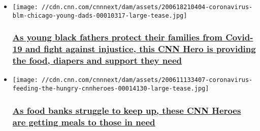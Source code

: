 \begin{itemize}
\item
  \href{/2020/06/18/us/coronavirus-blm-young-fathers-chicago-cnnheroes/index.html}{}

  \texttt{[image: //cdn.cnn.com/cnnnext/dam/assets/200618210404-coronavirus-blm-chicago-young-dads-00010317-large-tease.jpg]}

  \hypertarget{as-young-black-fathers-protect-their-families-from-covid-19-and-fight-against-injustice-this-cnn-hero-is-providing-the-food-diapers-and-support-they-need}{%
  \subsubsection{\texorpdfstring{\href{/2020/06/18/us/coronavirus-blm-young-fathers-chicago-cnnheroes/index.html}{As
  young black fathers protect their families from Covid-19 and fight
  against injustice, this CNN Hero is providing the food, diapers and
  support they
  need}}{As young black fathers protect their families from Covid-19 and fight against injustice, this CNN Hero is providing the food, diapers and support they need}}\label{as-young-black-fathers-protect-their-families-from-covid-19-and-fight-against-injustice-this-cnn-hero-is-providing-the-food-diapers-and-support-they-need}}
\end{itemize}

\begin{itemize}
\item
  \href{/2020/06/11/us/coronavirus-food-insecurity-healthy-meals-cnnheroes/index.html}{}

  \texttt{[image: //cdn.cnn.com/cnnnext/dam/assets/200611133407-coronavirus-feeding-the-hungry-cnnheroes-00014130-large-tease.jpg]}

  \hypertarget{as-food-banks-struggle-to-keep-up-these-cnn-heroes-are-getting-meals-to-those-in-need}{%
  \subsubsection{\texorpdfstring{\href{/2020/06/11/us/coronavirus-food-insecurity-healthy-meals-cnnheroes/index.html}{As
  food banks struggle to keep up, these CNN Heroes are getting meals to
  those in
  need}}{As food banks struggle to keep up, these CNN Heroes are getting meals to those in need}}\label{as-food-banks-struggle-to-keep-up-these-cnn-heroes-are-getting-meals-to-those-in-need}}
\end{itemize}

